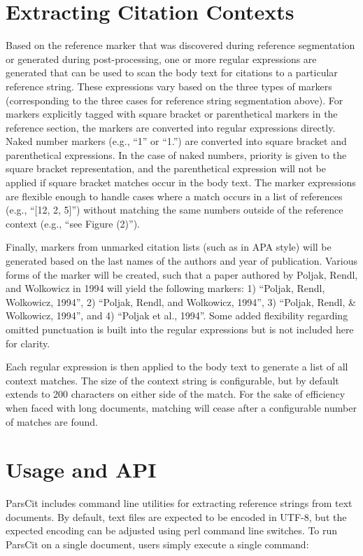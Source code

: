 \documentclass[10pt, a4paper]{article}
\begin{document}
\section{Extracting Citation Contexts}

Based on the reference marker that was discovered during reference
segmentation or generated during post-processing, one or more regular
expressions are generated that can be used to scan the body text for
citations to a particular reference string. These expressions vary based
on the three types of markers (corresponding to the three cases for
reference string segmentation above). For markers explicitly tagged with
square bracket or parenthetical markers in the reference section, the
markers are converted into regular expressions directly. Naked number
markers (e.g., ``1'' or ``1.'') are converted into square bracket and
parenthetical expressions. In the case of naked numbers, priority is
given to the square bracket representation, and the parenthetical
expression will not be applied if square bracket matches occur in the
body text. The marker expressions are flexible enough to handle cases
where a match occurs in a list of references (e.g., ``[12, 2, 5]'')
without matching the same numbers outside of the reference context
(e.g., ``see Figure (2)'').

Finally, markers from unmarked citation lists (such as in APA style)
will be generated based on the last names of the authors and year of
publication. Various forms of the marker will be created, such that a
paper authored by Poljak, Rendl, and Wolkowicz in 1994 will yield the
following markers: 1) ``Poljak, Rendl, Wolkowicz, 1994'', 2) ``Poljak,
Rendl, and Wolkowicz, 1994'', 3) ``Poljak, Rendl, \& Wolkowicz, 1994'',
and 4) ``Poljak et al., 1994''. Some added flexibility regarding
omitted punctuation is built into the regular expressions but is not
included here for clarity.

Each regular expression is then applied to the body text to generate a
list of all context matches. The size of the context string is
configurable, but by default extends to 200 characters on either side
of the match. For the sake of efficiency when faced with long
documents, matching will cease after a configurable number of matches
are found.

\section{Usage and API}

ParsCit includes command line utilities for extracting reference
strings from text documents. By default, text files are expected to be
encoded in UTF-8, but the expected encoding can be adjusted using perl
command line switches. To run ParsCit on a single document, users simply
execute a single command:
\end{document}
